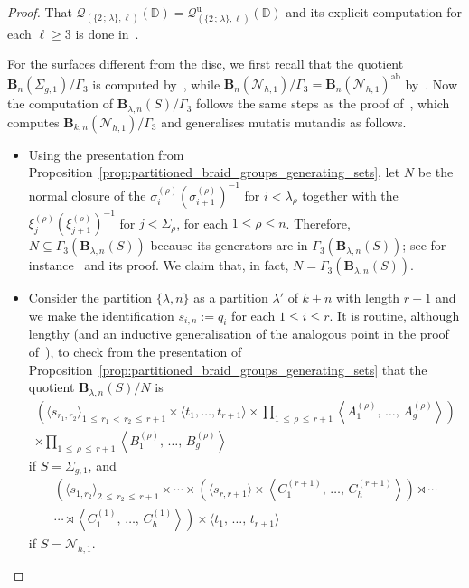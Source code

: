 \documentclass[AHL,Unicode,published]{cedram}
\newcommand{\ab}{\mathrm{ab}}
\newcommand{\unt}{\mathrm{u}}
\newcommand{\B}{\ensuremath{\mathbf{B}}}
\newcommand{\LCS}{\varGamma}
\newcommand{\N}{\mathscr{N}}
\newcommand{\cQ}{\mathcal{Q}}
\newcommand{\bD}{\mathbb{D}}
\renewcommand{\geq}{\geqslant}
\renewcommand{\leq}{\leqslant}
\begin{document}
\begin{proof}
That $\cQ_{(\boldsymbol{\{}2\,;\,\lambda\boldsymbol{\}},\ell)}(\bD)=\cQ^{\unt}_{(\boldsymbol{\{}2\,;\,\lambda\boldsymbol{\}},\ell)}(\bD)$ and its explicit computation for each $\ell\geq 3$ is done in~\cite[\S~4, Cor.~5.4]{PSIN}.

For the surfaces different from the disc, we first recall that the quotient $\B_{n}(\Sigma_{g,1})/\LCS_{3}$ is computed by~\cite[Prop.~3.13]{BellingeriGodelleGuaschi}, while $\B_{n}(\N_{h,1})/\LCS_{3}=\B_{n}(\N_{h,1})^{\ab}$ by~\cite[Th.~6.42]{DPS}. Now the computation of $\B_{\lambda,n}(S)/\LCS_{3}$ follows the same steps as the proof of~\cite[Prop.~6.58]{DPS}, which computes $\B_{k,n}(\N_{h,1})/\LCS_{3}$ and generalises mutatis mutandis as follows.
\begin{itemize}
\item Using the presentation from Proposition~\ref{prop:partitioned_braid_groups_generating_sets}, let $N$ be the normal closure of the $\sigma^{(\rho)}_{i}(\sigma^{(\rho)}_{i+1})^{-1}$ for $i<\lambda_{\rho}$ together with the $\xi^{(\rho)}_j (\xi^{(\rho)}_{j+1})^{-1}$ for $j < \varSigma_{\rho}$, for each $1\leq \rho\leq n$. Therefore, $N \subseteq \LCS_{3}(\B_{\lambda,n}(S))$ because its generators are in $\LCS_3(\B_{\lambda,n}(S))$; see for instance~\cite[Lem.~6.49]{DPS} and its proof. We claim that, in fact, $N = \LCS_{3}(\B_{\lambda,n}(S))$.

\item Consider the partition $\boldsymbol{\{} \lambda,n\boldsymbol{\}}$ as a partition $\lambda'$ of $k+n$ with length $r+1$ and we make the identification $s_{i,n}:=q_{i}$ for each $1\leq i\leq r$. It is routine, although lengthy (and an inductive generalisation of the analogous point in the proof of~\cite[Prop.~6.58]{DPS}), to check from the presentation of Proposition~\ref{prop:partitioned_braid_groups_generating_sets} that the quotient $\B_{\lambda,n}(S)/N$ is
\begin{multline}\label{eq:B_k,n(S)/LCS_3_orientable}
\left(\langle s_{r_{1},r_{2}}\rangle_{1\,\leq\,r_{1}\,<\,r_{2}\,\leq\,r+1} \times \langle t_{1},\ldots,t_{r+1}\rangle \times\prod_{1\,\leq\,\rho\,\leq \,r+1}\left\langle A_{1}^{(\rho)},\,\ldots,\,A_{g}^{(\rho)}\right\rangle\right) \\
\rtimes \prod_{1\,\leq\,\rho\,\leq\,r+1}\left\langle B_{1}^{(\rho)},\,\ldots,\,B_{g}^{(\rho)}\right\rangle
\end{multline}
if $S=\Sigma_{g,1}$, and
\begin{multline}\label{eq:B_k,n(S)/LCS_3_non_orientable}
\left(\langle s_{1,r_{2}}\rangle_{2\,\leq\,r_{2}\,\leq\,r+1}\times\cdots\times\left(\langle s_{r,r+1}\rangle\times\left\langle C_{1}^{(r+1)},\,\ldots,\,C_{h}^{(r+1)}\right\rangle\right)\rtimes \cdots \right. \\
\left. \cdots \rtimes \left\langle C_{1}^{(1)},\,\ldots,\,C_{h}^{(1)}\right\rangle \right) \times \langle t_{1},\,\ldots,\,t_{r+1}\rangle
\end{multline}
if $S=\N_{h,1}$.


\end{itemize}
\end{proof}
\end{document}

